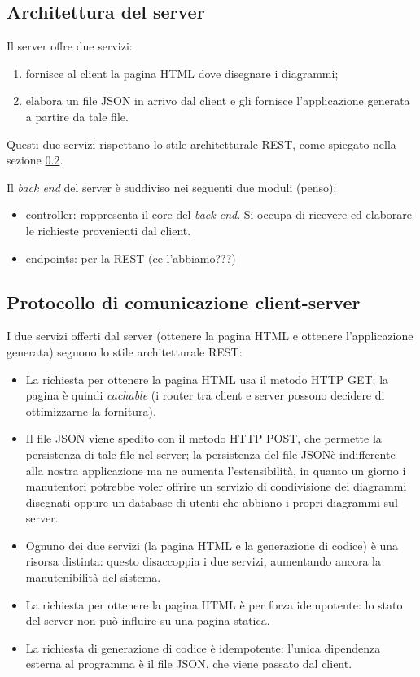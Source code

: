 \subsection{Architettura del server} \label{sec:arch_server}
Il server offre due servizi:
\begin{enumerate}
	\item fornisce al client la pagina HTML dove disegnare i diagrammi;
	\item elabora un file JSON in arrivo dal client e gli fornisce l'applicazione generata a partire da tale file.
\end{enumerate}
Questi due servizi rispettano lo stile architetturale REST, come spiegato nella sezione \ref{sec:arch_proto}.

Il \emph{back end} del server è suddiviso nei seguenti due moduli (penso):
\begin{itemize}
	\item controller: rappresenta il core del \emph{back end}. Si occupa di ricevere ed elaborare le richieste provenienti dal client.
	\item endpoints: per la REST (ce l'abbiamo???)
\end{itemize}



\subsection{Protocollo di comunicazione client-server} \label{sec:arch_proto}
I due servizi offerti dal server (ottenere la pagina HTML e ottenere l'applicazione generata) seguono lo stile architetturale REST:
\begin{itemize}
	\item La richiesta per ottenere la pagina HTML usa il metodo HTTP GET; la pagina è quindi \emph{cachable} (i router tra client e server possono decidere di ottimizzarne la fornitura).
	\item Il file JSON viene spedito con il metodo HTTP POST, che permette la persistenza di tale file nel server; la persistenza del file JSONè indifferente alla nostra applicazione ma ne aumenta l'estensibilità, in quanto un giorno i manutentori potrebbe voler offrire un servizio di condivisione dei diagrammi disegnati oppure un database di utenti che abbiano i propri diagrammi sul server.
	\item Ognuno dei due servizi (la pagina HTML e la generazione di codice) è una risorsa distinta: questo disaccoppia i due servizi, aumentando ancora la manutenibilità del sistema.
	\item La richiesta per ottenere la pagina HTML è per forza idempotente: lo stato del server non può influire su una pagina statica.
	\item La richiesta di generazione di codice è idempotente: l'unica dipendenza esterna al programma è il file JSON, che viene passato dal client.
\end{itemize}
